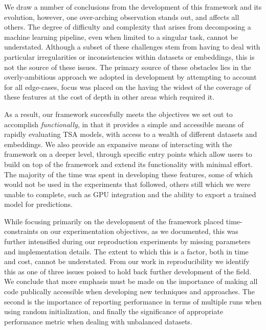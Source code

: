 \documentclass[../../fyp.tex]{subfiles}
\begin{document}
We draw a number of conclusions from the development of this framework and its evolution, however, one over-arching observation stands out, and affects all others. The degree of difficulty and complexity that arises from decomposing a machine learning pipeline, even when limited to a singular task, cannot be understated. Although a subset of these challenges stem from having to deal with particular irregularities or inconsistencies within datasets or embeddings, this is not the source of these issues. The primary source of these obstacles lies in the overly-ambitious approach we adopted in development by attempting to account for all edge-cases, focus was placed on the having the widest of the coverage of these features at the cost of depth in other areas which required it. 

As a result, our framework succesfully meets the objectives we set out to accomplish \textit{functionally}, in that it provides a simple and accessible means of rapidly evaluating TSA models, with access to a wealth of different datasets and embeddings. We also provide an expansive means of interacting with the framework on a deeper level, through specific entry points which allow users to build on top of the framework and extend its functionality with minimal effort. The majority of the time was spent in developing these features, some of which would not be used in the experiments that followed, others still which we were unable to complete, such as GPU integration and the ability to export a trained model for predictions.

While focusing primarily on the development of the framework placed time-constraints on our experimentation objectives, as we documented, this was further intensified during our reproduction experiments by missing parameters and implementation details. The extent to which this is a factor, both in time and cost, cannot be understated. From our work in reproducibility we identify this as one of three issues poised to hold back further development of the field. We conclude that more emphasis must be made on the importance of making all code publically accessible when developing new techniques and approaches. The second is the importance of reporting performance in terms of multiple runs when using random initialization, and finally the significance of appropriate performance metric when dealing with unbalanced datasets. 
\end{document}
